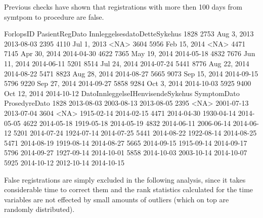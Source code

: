 \documentclass[a4paper]{report}
\begin{document}
Previous checks have shown that registrations with more then 100 days from symtpom to procedure are false.
\begin{Schunk}
\begin{Soutput}
     ForlopsID PasientRegDato InnleggelsesdatoDetteSykehus
1828      2753    Aug 3, 2013                   2013-08-03
2395      4110    Jul 1, 2013                         <NA>
3604      5956   Feb 15, 2014                         <NA>
4471      7145   Apr 30, 2014                   2014-04-30
4622      7365   May 19, 2014                   2014-05-18
4832      7676   Jun 11, 2014                   2014-06-11
5201      8514   Jul 24, 2014                   2014-07-24
5441      8776   Aug 22, 2014                   2014-08-22
5471      8823   Aug 28, 2014                   2014-08-27
5665      9073   Sep 15, 2014                   2014-09-15
5796      9220   Sep 27, 2014                   2014-09-27
5858      9284    Oct 3, 2014                   2014-10-03
5925      9400   Oct 12, 2014                   2014-10-12
     DatoInnleggelseIHenvisendeSykehus SymptomDato ProsedyreDato
1828                        2013-08-03  2003-08-13    2013-08-05
2395                              <NA>  2001-07-13    2013-07-04
3604                              <NA>  1915-02-14    2014-02-15
4471                        2014-04-30  1930-04-14    2014-05-05
4622                        2014-05-18  1919-05-18    2014-05-19
4832                        2014-06-11  2006-06-14    2014-06-12
5201                        2014-07-24  1924-07-14    2014-07-25
5441                        2014-08-22  1922-08-14    2014-08-25
5471                        2014-08-19  1919-08-14    2014-08-27
5665                        2014-09-15  1915-09-14    2014-09-17
5796                        2014-09-27  1927-09-14    2014-10-01
5858                        2014-10-03  2003-10-14    2014-10-07
5925                        2014-10-12  2012-10-14    2014-10-15
\end{Soutput}
\end{Schunk}




False registrations are simply excluded in the following analysis, since it takes considerable time to correct them and the rank statistics calculated for the time variables are not effected by small amounts of outliers (which on top are randomly distributed).
\end{document}
